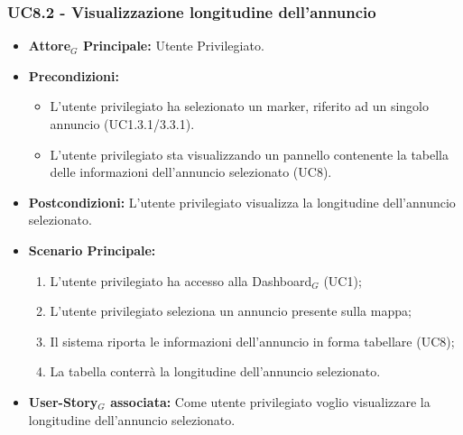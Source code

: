 \documentclass[11pt]{article}
\begin{document}
\begin{justify}
 \subsubsection{\textbf{UC8.2 - Visualizzazione longitudine dell'annuncio}}
 \begin{itemize}
     \item \textbf{Attore$_G$ Principale:} Utente Privilegiato.
     \item \textbf{Precondizioni:}
       \begin{itemize}
    	        \item L'utente privilegiato ha selezionato un marker, riferito ad un singolo annuncio (UC1.3.1/3.3.1).
          \item L'utente privilegiato sta visualizzando un pannello contenente la tabella delle informazioni dell'annuncio selezionato (UC8).
       \end{itemize}
     \item \textbf{Postcondizioni:} L'utente privilegiato visualizza la longitudine dell'annuncio selezionato.
     \item \textbf{Scenario Principale:}
        \begin{enumerate}
            \item L'utente privilegiato ha accesso alla Dashboard$_G$ (UC1);
            \item L'utente privilegiato seleziona un annuncio presente sulla mappa;
            \item Il sistema riporta le informazioni dell'annuncio in forma tabellare (UC8);
            \item La tabella conterrà la longitudine dell'annuncio selezionato.
        \end{enumerate}
     \item \textbf{User-Story$_G$ associata:} Come utente privilegiato voglio visualizzare la longitudine dell'annuncio selezionato. 
 \end{itemize}

\end{justify}
\end{document}
